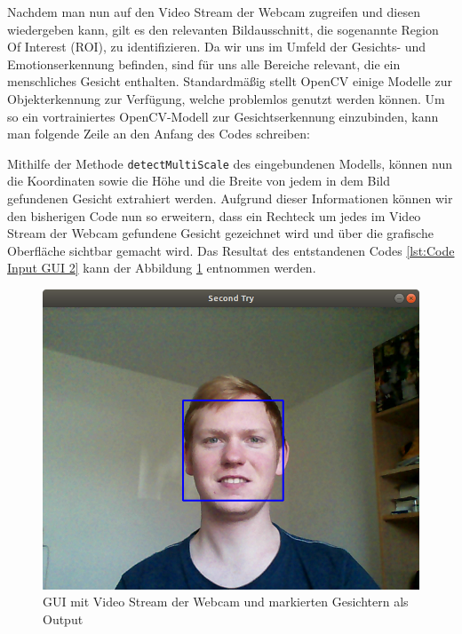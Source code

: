 \documentclass[12pt, a4paper]{report}
\begin{document}
Nachdem man nun auf den Video Stream der Webcam zugreifen und diesen wiedergeben kann, gilt es den relevanten Bildausschnitt, die sogenannte Region Of Interest (ROI), zu identifizieren. Da wir uns im Umfeld der Gesichts- und Emotionserkennung befinden, sind für uns alle Bereiche relevant, die ein menschliches Gesicht enthalten. Standardmäßig stellt OpenCV einige Modelle zur Objekterkennung zur Verfügung, welche problemlos genutzt werden können. Um so ein vortrainiertes OpenCV-Modell zur Gesichtserkennung einzubinden, kann man folgende Zeile an den Anfang des Codes schreiben:\newline

Mithilfe der Methode \texttt{detectMultiScale} des eingebundenen Modells, können nun die Koordinaten sowie die Höhe und die Breite von jedem in dem Bild gefundenen Gesicht extrahiert werden. Aufgrund dieser Informationen können wir den bisherigen Code nun so erweitern, dass ein Rechteck um jedes im Video Stream der Webcam gefundene Gesicht gezeichnet wird und über die grafische Oberfläche sichtbar gemacht wird. Das Resultat des entstandenen Codes \ref{lst:Code Input GUI 2} kann der Abbildung \ref{fig:Input GUI 2} entnommen werden.
\begin{figure}[h]
\includegraphics[width=\linewidth]{Bilder/InputGUI2.png}
\caption{GUI mit Video Stream der Webcam und markierten Gesichtern als Output}
\label{fig:Input GUI 2}
\end{figure}
\end{document}
